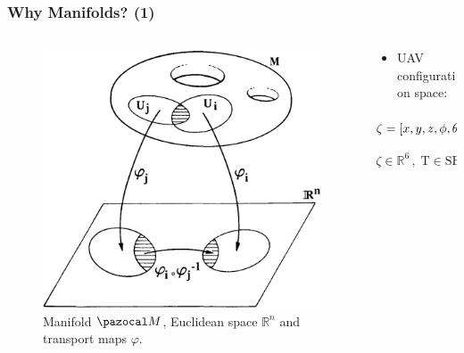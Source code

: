 \begin{frame}
	\frametitle{Why Manifolds? (1)}
	\begin{columns}
		
		\begin{column}{0.4\textwidth}\centering
			\begin{figure}[H]
				\includegraphics[width=0.9\columnwidth]{figures/manifold.png}	
				\centering
				\caption{Manifold $\Ma$, Euclidean space $\mathbb{R}^n$ and transport maps $\varphi$.\footnotemark}
				\label{fig:aerial_manip}
			\end{figure}
		\end{column}
	
	\begin{column}{0.6\textwidth}\centering
		\begin{itemize}
			\item UAV configuration space:
		\end{itemize}
		\begin{equation}
			\zeta = [x, y, z, \phi, \theta, \psi] 
			\xleftrightarrow{\varphi}
			\text{T} = \begin{bmatrix}
			\text{R} & \textbf{p} \\
			\textbf{0} & 1
			\end{bmatrix}
		\end{equation}
		\begin{equation}
			\zeta \in \mathbb{R}^6  \, , \; \text{T} \in \text{SE(3)} \, , \; \text{R} \in \text{SO(3)}
		\end{equation}
		

\end{column}
\end{columns}
\end{frame}
